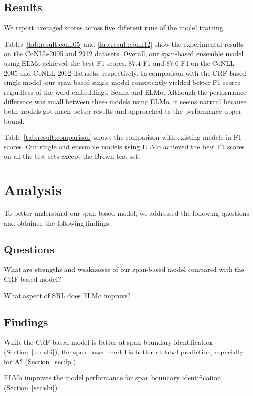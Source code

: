 \documentclass[11pt,a4paper]{article}
\begin{document}
\subsection{Results}
\label{sec:label}
We report averaged scores across five different runs of the model training.

Tables~\ref{tab:result:conll05} and \ref{tab:result:conll12} show the experimental results on the CoNLL-2005 and 2012 datasets.
Overall, our span-based ensemble model using ELMo achieved the best F1 scores, 87.4 F1 and 87.0 F1 on the CoNLL-2005 and CoNLL-2012 datasets, respectively.
In comparison with the CRF-based single model, our span-based single model consistently yielded better F1 scores regardless of the word embeddings, {\sc Senna} and {\sc ELMo}.
Although the performance difference was small between these models using {\sc ELMo}, it seems natural because both models got much better results and approached to the performance upper bound.

Table~\ref{tab:result:comparison} shows the comparison with existing models in F1 scores.
Our single and ensemble models using {\sc ELMo} achieved the best F1 scores on all the test sets except the Brown test set.


\section{Analysis}
\label{sec:analysis}

To better understand our span-based model, we addressed the following questions and obtained the following findings.

\subsection*{Questions}
\begin{description}
\setlength{\parskip}{0cm} 
\setlength{\itemsep}{0cm} 
\item[(a)] What are strengths and weaknesses of our span-based model compared with the CRF-based model?
\item[(b)] What aspect of SRL does ELMo improve?
\end{description}

\subsection*{Findings}
\begin{description}
\setlength{\parskip}{0cm} 
\setlength{\itemsep}{0cm} 
\item[(a)] While the CRF-based model is better at span boundary identification (Section~\ref{sec:sbi}), the span-based model is better at label prediction, especially for A2 (Section~\ref{sec:lp}).
 \item[(b)] ELMo improves the model performance for span boundary identification (Section~\ref{sec:sbi}).
\end{description}
\end{document}
